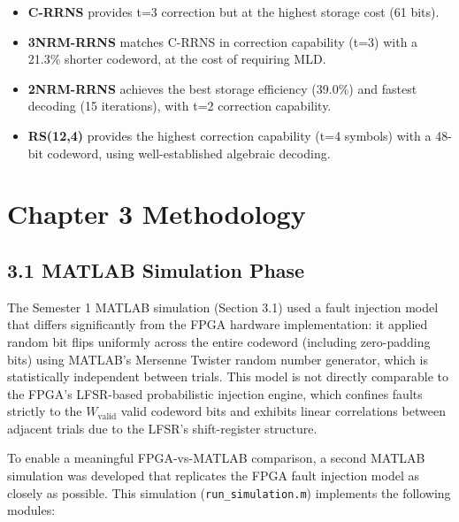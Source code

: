 \begin{itemize}
\tightlist
\item
  \textbf{C-RRNS} provides t=3 correction but at the highest storage
  cost (61 bits).
\item
  \textbf{3NRM-RRNS} matches C-RRNS in correction capability (t=3) with
  a 21.3\% shorter codeword, at the cost of requiring MLD.
\item
  \textbf{2NRM-RRNS} achieves the best storage efficiency (39.0\%) and
  fastest decoding (15 iterations), with t=2 correction capability.
\item
  \textbf{RS(12,4)} provides the highest correction capability (t=4
  symbols) with a 48-bit codeword, using well-established algebraic
  decoding.
\end{itemize}

\section{Chapter 3 Methodology}\label{chapter-3-methodology}

\subsection{3.1 MATLAB Simulation Phase}\label{matlab-simulation-phase}

The Semester 1 MATLAB simulation (Section 3.1) used a fault injection
model that differs significantly from the FPGA hardware implementation:
it applied random bit flips uniformly across the entire codeword
(including zero-padding bits) using MATLAB's Mersenne Twister random
number generator, which is statistically independent between trials.
This model is not directly comparable to the FPGA's LFSR-based
probabilistic injection engine, which confines faults strictly to the
\(W_{\text{valid}}\) valid codeword bits and exhibits linear
correlations between adjacent trials due to the LFSR's shift-register
structure.

To enable a meaningful FPGA-vs-MATLAB comparison, a second MATLAB
simulation was developed that replicates the FPGA fault injection model
as closely as possible. This simulation (\texttt{run\_simulation.m})
implements the following modules:

